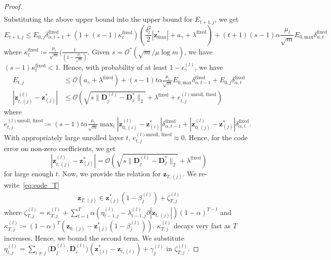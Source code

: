 \documentclass[10pt]{article} %
\newcommand{\D}{{\bm D}}
\newcommand{\z}{{\bm z}}
\begin{document}
\begin{proof}
\begin{equation}
\begin{aligned}
\end{aligned}
\end{equation}
Substituting the above upper bound into the upper bound for $E_{t+1,j}$, we get
\begin{equation}
E_{t+1, j} \leq E_{0, j} \delta_{\alpha,t+1}^{\text{fixed}} + (1 + (s-1) \kappa_l^{\text{fixed}}) (\frac{\delta_l^2}{2} | \z_{\text{max}}^{\ast}| + a_{\gamma} + \lambda^{\text{fixed}}) + (t+1)(s-1) \alpha \frac{\mu_l}{\sqrt{m}} E_{0, \text{max}} \delta_{\alpha,t}^{\text{fixed}}
\end{equation}
where $\kappa_l^{\text{fixed}} \coloneqq \frac{\mu_l}{\sqrt{m}} (\frac{1}{ (1 - \frac{\mu_l}{\sqrt{m}})}$. Given $s = \mathcal{O}^{\ast}(\sqrt{m}/\mu \log{m})$, we have $(s-1) \kappa_l^{\text{fixed}} < 1$. Hence, with probability of at least $1 - \epsilon_{\gamma}^{(l)}$, we have
\begin{equation}
\begin{aligned}
E_{t, j} &\leq  \mathcal{O}(a_{\gamma} + \lambda^{\text{fixed}}) + (s-1)t \alpha \frac{\mu_l}{\sqrt{m}} E_{0, \text{max}} \delta_{\alpha,t-1}^{\text{fixed}} + E_{0, j} \delta_{\alpha,t}^{\text{fixed}}\\
|\z_{t,(j)}^{(l)} - \z_{(j)}^{\ast} | &\leq  \mathcal{O}(\sqrt{s \| \D_j^{(l)} - \D_j^{\ast} \|_2} + \lambda^{\text{fixed}} + e_{t,j}^{(l)\text{unroll, fixed}})
\end{aligned}
\end{equation}
where $e_{t,j}^{(l)\text{unroll, fixed}} \coloneqq (s-1)t \alpha \frac{\mu_l}{\sqrt{m}} \max_i | \z_{0,(i)}^{(l)} - \z_{(i)}^{\ast} | \delta_{\alpha,t-1}^{\text{fixed}} + | \z_{0,(j)}^{(l)} - \z_{(j)}^{\ast} | \delta_{\alpha,t}^{\text{fixed}}$. With appropriately large unrolled layer $t$, $e_{t,j}^{(l)\text{unroll, fixed}} \approx 0$. Hence, for the code error on non-zero coefficients, we get
\begin{equation}
|\z_{t,(j)}^{(l)} - \z_{(j)}^{\ast} | = \mathcal{O}(\sqrt{s \| \D_j^{(l)} - \D_j^{\ast} \|_2} +  \lambda^{\text{fixed}})
\end{equation}
for large enough $t$. Now, we provide the relation for $\z_{T, (j)}$. We re-write~\eqref{eq:code_T}
\begin{equation}
\begin{aligned}
\z_{T, (j)} \in \z^{\ast}_{(j)} (1 - \beta_j^{(l)}) + \zeta_{T,j}^{(l)}
\end{aligned}
\end{equation}
where $\zeta _{T,j}^{(l)} = \kappa_{T,j}^{(l)} + \sum_{t=1}^T \alpha  (\eta_{t-1,j}^{(l)} - \lambda_{t-1,j}^{(l)}  \partial | \z_{t, (j)} |) (1 - \alpha)^{T-t}$ and $\kappa_{T,j}^{(l)} \coloneqq (1 - \alpha)^T (\z_{0, (j)} - \z^{\ast}_{(j)} (1 - \beta_j^{(l)}))$. $\kappa_{T,j}^{(l)}$ decays very fast as $T$ increases. Hence, we bound the second term. We substitute $\eta_{t,j}^{(l)} = \sum_{i \neq j} \langle \D_j^{(l)}, \D_i^{(l)} \rangle (\z^{\ast}_{(i)} - \z_{t, (i)}) + \gamma_j^{(l)}$ in $\zeta_{T,j}^{(l)}$.

\end{proof}
\end{document}
